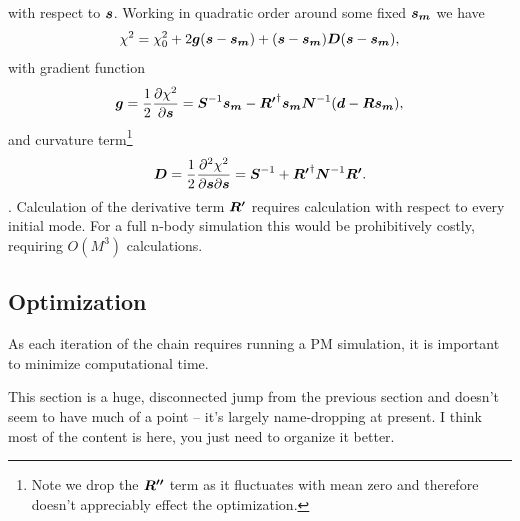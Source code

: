 \documentclass[times]{aastex62}
\def\bi#1{\hbox{\boldmath{$#1$}}}
\newcommand{\lya}{Ly$\alpha$}
\begin{document}
with respect to $\bi{s}$. Working in quadratic order around some fixed $\bi{s_m}$ we have
\begin{equation}
\chi^2 = \chi_0^2 + 2 \bi{g}(\bi{s}-\bi{s_m})+ (\bi{s}-\bi{s_m})\bi{D}(\bi{s}-\bi{s_m}),
\label{eq_chib}
\end{equation}
with gradient function
\begin{equation}
\bi{g}=\frac{1}{2}\frac{\partial \chi^2}{\partial \bi{s}}=\bi{S}^{-1}\bi{s_m}-\bi{R'}^\dag\bi{s_m}\bi{N}^{-1}(\bi{d}-\bi{Rs_m}),
\label{eq_cost}
\end{equation}
and curvature term\footnote{Note we drop the $\bi{R''}$ term as it fluctuates with mean zero and therefore doesn't appreciably effect the optimization.} 
\begin{equation}
\bi{D}=\frac{1}{2}\frac{\partial^2 \chi^2}{\partial \bi{s}\partial \bi{s}}=\bi{S}^{-1}+\bi{R'}^\dag\bi{N}^{-1}\bi{R'}. %
\label{eq_curv}
\end{equation}.
Calculation of the derivative term $\bi{R'}$ requires calculation with respect to every initial mode. For a full n-body simulation this would be prohibitively costly, requiring  $O(M^3)$ calculations. 


\subsection{Optimization }
As each iteration of the chain requires running a PM simulation, it is important to minimize computational time. 

{\color{red}This section is a huge, disconnected jump from the previous section and doesn't seem to have much of a point -- it's largely name-dropping at present.  I think most of the content is here, you just need to organize it better.}
\end{document}
